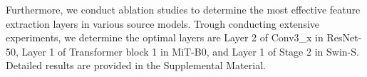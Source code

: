 Furthermore, we conduct ablation studies to determine the most effective feature extraction layers in various source models. Trough conducting extensive experiments, we determine the optimal layers are Layer 2 of Conv3\_x in ResNet-50, Layer 1 of Transformer block 1 in MiT-B0, and Layer 1 of Stage 2 in Swin-S. Detailed results are provided in the Supplemental Material.



 



